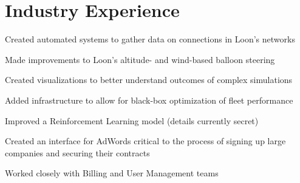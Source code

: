 \documentclass[letterpaper]{deedy-resume} %
\begin{document}
\begin{minipage}[t]{0.66\textwidth} %


\section{Industry Experience}


\vspace{\topsep} %
\begin{tightitemize}
    \item Created automated systems to gather data on connections in Loon’s networks
    \item Made improvements to Loon's altitude- and wind-based balloon steering
    \item Created visualizations to better understand outcomes of complex simulations
    \item Added infrastructure to allow for black-box optimization of fleet performance
    \item Improved a Reinforcement Learning model (details currently secret)
\end{tightitemize}

\sectionspace %



\begin{tightitemize}
    \item Created an interface for AdWords critical to the process of signing up large companies and securing their contracts
    \item Worked closely with Billing and User Management teams
\end{tightitemize}

\sectionspace %




\end{minipage}
\end{document}
